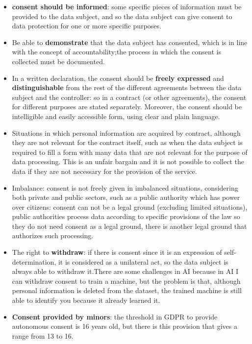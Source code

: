 \begin{itemize}
    \item \textbf{consent should be informed}: some specific pieces of information must be provided to the data subject, and so the data subject can give consent to data protection for one or more specific purposes.
    \item Be able to \textbf{demonstrate} that the data subject has consented, which is in line with the concept of accountability;the process in which the consent is collected must be documented.
    \item In a written declaration, the consent should be \textbf{freely expressed} and \textbf{distinguishable} from the rest of the different agreements between the data subject and the controller: so in a contract (or other agreements), the consent for different purposes are stated separately. Moreover, the consent should be intelligible and easily accessible form, using clear and plain language.
    \item  Situations in which personal information are acquired by contract, although they are not relevant for the contract itself, such as when the data subject is required to fill a form with many data that are not relevant for the purpose of data processing. This is an unfair bargain and it is not possible to collect the data if they are not necessary for the provision of the service.
    \item Imbalance: consent is not freely given in imbalanced situations, considering both private and public sectors, such as a public authority which has power over citizens: consent can not be a legal ground (excluding limited situations), public authorities process data according to specific provisions of the law so they do not need consent as a legal ground, there is another legal ground that authorizes such processing.
    \item The right to \textbf{withdraw}: if there is consent since it is an expression of self-determination, it is considered as a unilateral act, so the data subject is always able to withdraw it.There are some challenges in AI because in AI I can withdraw consent to train a machine, but the problem is that, although personal information is deleted from the dataset, the trained machine is still able to identify you because it already learned it.
    \item \textbf{Consent provided by minors}: the threshold in GDPR to provide autonomous consent is 16 years old, but there is this provision that gives a range from 13 to 16.
\end{itemize}

